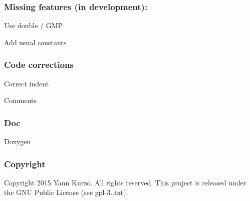 \subsubsection*{Missing features (in development)\+:}


\begin{DoxyItemize}
\item Use double / G\+M\+P
\item Add usual constants
\end{DoxyItemize}

\subsubsection*{Code corrections}


\begin{DoxyItemize}
\item Correct indent
\item Comments
\end{DoxyItemize}

\subsubsection*{Doc}


\begin{DoxyItemize}
\item Doxygen
\end{DoxyItemize}

\subsubsection*{Copyright}

Copyright 2015 Yann Kurzo. All rights reserved. This project is released under the G\+N\+U Public License (see gpl-\/3..\+txt). 